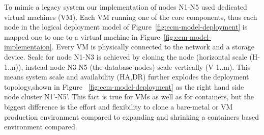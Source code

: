 \documentclass[EPiC]{easychair} %
\begin{document}
    \noindent To mimic a legacy system our implementation of nodes N1-N5 used dedicated virtual machines (VM). Each VM running one of the core components, thus each node in the logical deployment model of Figure~\ref{fig:ecm-model-deployment} is mapped one to one to a virtual machine in Figure~\ref{fig:ecm-model-implementaion}. Every VM is physically connected  to the network and a storage device. Scale for node N1-N3 is achieved by cloning the node (horizontal scale (H-1..n)), instead node N3-N5 (the database nodes) scale vertically (V-1..m). This means system scale and availability (HA,DR) further explodes the deployment topology,shown in Figure ~\ref{fig:ecm-model-deployment} as the right hand side node cluster N1'-N5'. This fact is true for VMs as well as for containers, but the biggest difference is the effort and flexibility to clone a bare-metal or VM production environment compared to expanding and shrinking a containers based environment compared.\\ 
    
\end{document}
